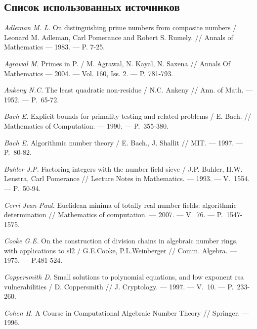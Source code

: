 \renewcommand{\bibname}{БИБЛИОГРАФИЧЕСКИЙ СПИСОК}

\begin{thebibliography}{99}
\section*{Список использованных источников}
\vspace{-12pt}

    \textit{Adleman M. L.} On distinguishing prime numbers from composite numbers / Leonard M. Adleman, Carl Pomerance and Robert S. Rumely. // Annals of Mathematics --- 1983. --- P. 7-25.
    
    \textit{Agrawal M.} Primes in P. / M. Agrawal, N. Kayal, N. Saxena // Annals Of Mathematics --- 2004. --- Vol. 160, Iss. 2. --- P. 781-793.
    
    \textit{Ankeny N.C.} The least quadratic non-residue / N.C. Ankeny // Ann. of Math. --- 1952. --- P.~65-72.

    \textit{Bach E.} Explicit bounds for primality testing and related problems / E. Bach. // Mathematics of Computation. --- 1990. --- P.~355-380.
    
    \textit{Bach E.} Algorithmic number theory / E. Bach., J. Shallit // MIT. --- 1997. --- P.~80-82.
    
    \textit{Buhler J.P.} Factoring integers with the number field sieve / J.P. Buhler, H.W. Lenstra, Carl Pomerance // Lecture Notes in Mathematics. --- 1993. --- V.~1554. --- P.~50-94.

    \textit{Cerri Jean-Paul.} Euclidean minima of totally real number fields: algorithmic determination // Mathematics of computation. --- 2007. --- V.~76. --- {P.}~1547-1575.

    \textit{Cooke G.E.} On the construction of division chains in algebraic number rings, with applications to sl2 / G.E.Cooke, P.L.Weinberger // Comm. Algebra. --- 1975. --- P.481-524.

    \textit{Coppersmith D.} Small solutions to polynomial equations, and low exponent rsa vulnerabilities / D. Coppersmith // J. Cryptology. --- 1997. --- V.~10. --- P.~233-260.

    \textit{Cohen H.} A Course in Computational Algebraic Number Theory // Springer. --- 1996.
    

\end{thebibliography}
